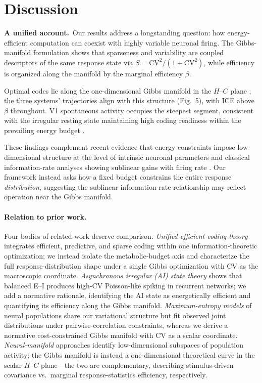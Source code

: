 \section{Discussion}
\label{sec:discussion}

\textbf{A unified account.}~Our results address a longstanding question: how energy-efficient computation can coexist with highly variable neuronal firing. The Gibbs-manifold formulation shows that sparseness and variability are coupled descriptors of the same response state via $S = \mathrm{CV}^2/(1+\mathrm{CV}^2)$, while efficiency is organized along the manifold by the marginal efficiency $\beta$.

Optimal codes lie along the one-dimensional Gibbs manifold in the $H$--$C$ plane \cite{laughlin_energy_2001, Harris2012, Shoval2012}; the three systems' trajectories align with this structure (Fig.~5), with ICE above $\beta$ throughout. V1 spontaneous activity occupies the steepest segment, consistent with the irregular resting state maintaining high coding readiness within the prevailing energy budget \cite{Raichle2001}.

These findings complement recent evidence that energy constraints impose low-dimensional structure at the level of intrinsic neuronal parameters \cite{Sommer2026} and classical information-rate analyses showing sublinear gains with firing rate \cite{Rieke1997,Sterling2015}. Our framework instead asks how a fixed budget constrains the entire response \emph{distribution}, suggesting the sublinear information-rate relationship may reflect operation near the Gibbs manifold.

\paragraph{Relation to prior work.}
Four bodies of related work deserve comparison.  \emph{Unified efficient coding theory} \cite{Chalk2018} integrates efficient, predictive, and sparse coding within one information-theoretic optimization; we instead isolate the metabolic-budget axis and characterize the full response-distribution shape under a single Gibbs optimization with CV as the macroscopic coordinate.  \emph{Asynchronous irregular (AI) state theory} \cite{Renart2010,LitwinKumar2012} shows that balanced E--I produces high-CV Poisson-like spiking in recurrent networks; we add a normative rationale, identifying the AI state as energetically efficient and quantifying its efficiency along the Gibbs manifold.  \emph{Maximum-entropy models} of neural populations \cite{45} share our variational structure but fit observed joint distributions under pairwise-correlation constraints, whereas we derive a normative cost-constrained Gibbs manifold with CV as a scalar coordinate.  \emph{Neural-manifold} approaches identify low-dimensional subspaces of population activity; the Gibbs manifold is instead a one-dimensional theoretical curve in the scalar $H$--$C$ plane---the two are complementary, describing stimulus-driven covariance vs.\ marginal response-statistics efficiency, respectively.

